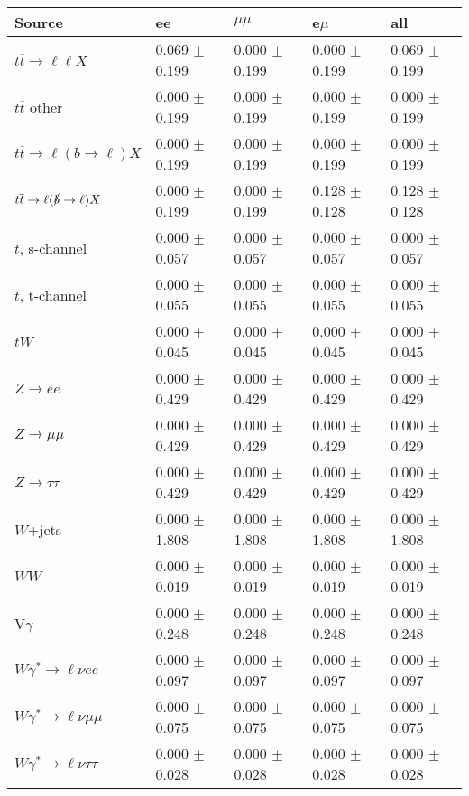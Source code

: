 \begin{tabular}{l | l l l l}
\hline\hline
 Source  &  ee  &  $\mu\mu$  &  e$\mu$  &  all \\
\hline
$t\overline{t}\rightarrow \ell\ell X$ &  0.069 $\pm$  0.199 &  0.000 $\pm$  0.199 &  0.000 $\pm$  0.199 &  0.069 $\pm$  0.199\\
$t\overline{t}$ other &  0.000 $\pm$  0.199 &  0.000 $\pm$  0.199 &  0.000 $\pm$  0.199 &  0.000 $\pm$  0.199\\
$t\overline{t}\rightarrow \ell(b\rightarrow \ell)X$ &  0.000 $\pm$  0.199 &  0.000 $\pm$  0.199 &  0.000 $\pm$  0.199 &  0.000 $\pm$  0.199\\
$t\overline{t}\rightarrow \ell(\slashed{b}\rightarrow \ell)X$ &  0.000 $\pm$  0.199 &  0.000 $\pm$  0.199 &  0.128 $\pm$  0.128 &  0.128 $\pm$  0.128\\
\hline
$t$, s-channel &  0.000 $\pm$  0.057 &  0.000 $\pm$  0.057 &  0.000 $\pm$  0.057 &  0.000 $\pm$  0.057\\
$t$, t-channel &  0.000 $\pm$  0.055 &  0.000 $\pm$  0.055 &  0.000 $\pm$  0.055 &  0.000 $\pm$  0.055\\
$tW$ &  0.000 $\pm$  0.045 &  0.000 $\pm$  0.045 &  0.000 $\pm$  0.045 &  0.000 $\pm$  0.045\\
\hline
$Z\rightarrow ee$ &  0.000 $\pm$  0.429 &  0.000 $\pm$  0.429 &  0.000 $\pm$  0.429 &  0.000 $\pm$  0.429\\
$Z\rightarrow\mu\mu$ &  0.000 $\pm$  0.429 &  0.000 $\pm$  0.429 &  0.000 $\pm$  0.429 &  0.000 $\pm$  0.429\\
$Z\rightarrow\tau\tau$ &  0.000 $\pm$  0.429 &  0.000 $\pm$  0.429 &  0.000 $\pm$  0.429 &  0.000 $\pm$  0.429\\
$W$+jets &  0.000 $\pm$  1.808 &  0.000 $\pm$  1.808 &  0.000 $\pm$  1.808 &  0.000 $\pm$  1.808\\
$WW$ &  0.000 $\pm$  0.019 &  0.000 $\pm$  0.019 &  0.000 $\pm$  0.019 &  0.000 $\pm$  0.019\\
\hline
V$\gamma$ &  0.000 $\pm$  0.248 &  0.000 $\pm$  0.248 &  0.000 $\pm$  0.248 &  0.000 $\pm$  0.248\\
$W\gamma^{*}\rightarrow\ell\nu e e$ &  0.000 $\pm$  0.097 &  0.000 $\pm$  0.097 &  0.000 $\pm$  0.097 &  0.000 $\pm$  0.097\\
$W\gamma^{*}\rightarrow\ell\nu\mu\mu$ &  0.000 $\pm$  0.075 &  0.000 $\pm$  0.075 &  0.000 $\pm$  0.075 &  0.000 $\pm$  0.075\\
$W\gamma^{*}\rightarrow\ell\nu\tau\tau$ &  0.000 $\pm$  0.028 &  0.000 $\pm$  0.028 &  0.000 $\pm$  0.028 &  0.000 $\pm$  0.028\\

\end{tabular}
